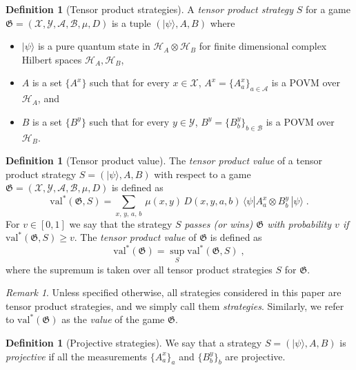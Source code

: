 \documentclass{book}
\theoremstyle{plain}
\theoremstyle{definition}
\newtheorem{definition}[subsection]{Definition}
\theoremstyle{remark}
\newtheorem{remark}[subsection]{Remark}
\numberwithin{equation}{subsection}
\newcommand{\cal}[1]{\mathcal{#1}}
\newcommand{\mH}{\mathcal{H}}
\newcommand{\ket}[1]{|#1\rangle}
\newcommand{\bra}[1]{\langle#1|}
\newcommand{\game}{\mathfrak{G}}
\newcommand{\strategy}{{S}}
\newcommand{\val}{\ensuremath{\mathrm{val}}}
\begin{document}
\begin{definition}[Tensor product strategies]
  \label{def:tensor-product-strategy}
  A \emph{tensor product strategy} $\strategy$ for a game $\game = (\cal{X},
  \cal{Y}, \cal{A}, \cal{B}, \mu, D)$ is a tuple $(\ket{\psi}, A, B)$ where
  \begin{itemize}
	\item $\ket{\psi}$ is a pure quantum state in $\mH_A \otimes \mH_B$ for finite
    dimensional complex Hilbert spaces $\mH_A, \mH_B$,
	\item $A$ is a set $\{A^x\}$ such that for every $x \in \cal{X}$, $A^x =
    \{A^x_a \}_{a \in \cal{A}}$ is a POVM over $\mH_A$, and
	\item $B$ is a set $\{B^y\}$ such that for every $y \in \cal{Y}$, $B^y =
    \{B^y_b \}_{b \in \cal{B}}$ is a POVM over $\mH_B$.
\end{itemize}
\end{definition}

\begin{definition}[Tensor product value]
  \label{def:tensor-product-value}
	The \emph{tensor product value} of a tensor product strategy $\strategy =
  (\ket{\psi}, A, B)$  with respect to a game $\game=(\cal{X}, \cal{Y}, \cal{A},
  \cal{B}, \mu, D)$ is defined as
  \begin{equation*}
		\val^*(\game, \strategy) = \sum_{x,\, y,\, a,\, b} \, \mu(x,y)\, D(x,y,a,b)\,
    \bra{\psi} A^x_a \otimes B^y_b\, \ket{\psi}\;.
  \end{equation*}
	For $v\in[0,1]$ we say that the strategy $\strategy$ \emph{passes (or wins)
    $\game$ with probability $v$ if} $\val^*(\game, \strategy) \geq v$.
  The \emph{tensor product value} of $\game$ is defined as
  \begin{equation*}
		\val^*(\game) = \sup_\strategy \val^*(\game, \strategy)\;,
  \end{equation*}
	where the supremum is taken over all tensor product strategies $\strategy$ for
  $\game$.
\end{definition}


\begin{remark}
  Unless specified otherwise, all strategies considered in this paper are tensor
  product strategies, and we simply call them \emph{strategies}.
  Similarly, we refer to $\val^*(\game)$ as the \emph{value} of the game
  $\game$.
\end{remark}


\begin{definition}[Projective strategies]
  \label{def:projective-strategy}
  We say that a strategy $\strategy = (\ket{\psi}, A, B)$ is \emph{projective} if
  all the measurements $\{A^x_a\}_a$ and $\{B^y_b\}_b$ are projective.
\end{definition}
\end{document}

